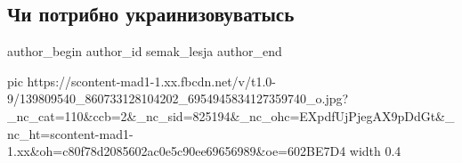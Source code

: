  
 
 
 
 
\subsection{Чи потрибно украинизовуватысь}
\label{sec:18_01_2021.fb.semak_lesja.1.mova}
\ifcmt
  author_begin
   author_id semak_lesja
  author_end
\fi

\ifcmt
  pic https://scontent-mad1-1.xx.fbcdn.net/v/t1.0-9/139809540_860733128104202_6954945834127359740_o.jpg?_nc_cat=110&ccb=2&_nc_sid=825194&_nc_ohc=EXpdfUjPjegAX9pDdGt&_nc_ht=scontent-mad1-1.xx&oh=c80f78d2085602ac0e5c90ee69656989&oe=602BE7D4
  width 0.4
\fi


